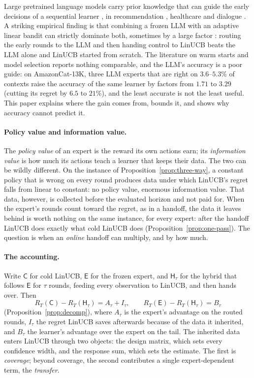 \documentclass{article}
\theoremstyle{definition}
\theoremstyle{remark}
\theoremstyle{remark}
\newcommand{\Cold}{\mathsf{C}}
\newcommand{\Exp}{\mathsf{E}}
\newcommand{\Hyb}{\mathsf{H}}
\begin{document}
Large pretrained language models carry prior knowledge that can guide the
early decisions of a sequential learner
\cite{brown2020language,ouyang2022training,achiam2023gpt,alamdari2024jumpstarting,abbasiyadkori2024believe},
in recommendation \cite{li2010contextual,agarwal2016making}, healthcare
\cite{tewari2017ads,svensson2023sequential} and dialogue \cite{li2016deep}.
A striking empirical finding is that combining a frozen LLM with an adaptive
linear bandit can strictly dominate both, sometimes by a large factor
\cite{chen2024llmdecision,huangcontextual}: routing the early rounds to the
LLM and then handing control to LinUCB beats the LLM alone and LinUCB started
from scratch. The literature on warm starts and model selection
\cite{bastani2021mostly,zhang2019warm,agarwal2017corralling} reports nothing
comparable, and the LLM's accuracy is a poor guide: on AmazonCat-13K, three
LLM experts that are right on $3.6$--$5.3\%$ of contexts raise the accuracy of
the same learner by factors from $1.71$ to $3.29$ (cutting its regret by $6.5$
to $21\%$), and the least accurate is not the least useful. This paper explains where the gain comes from, bounds
it, and shows why accuracy cannot predict it.

\paragraph{Policy value and information value.}
The \emph{policy value} of an expert is the reward its own actions earn; its
\emph{information value} is how much its actions teach a learner that keeps
their data. The two can be wildly different. On the instance of
Proposition~\ref{prop:three-way}, a constant policy that is wrong on every
round produces data under which LinUCB's regret falls from linear to
constant: no policy value, enormous information value. That data, however, is
collected before the evaluated horizon and not paid for. When the expert's
rounds count toward the regret, as in a handoff, the data it leaves behind is
worth nothing on the same instance, for every expert: after the handoff
LinUCB does exactly what cold LinUCB does (Proposition~\ref{prop:one-pass}). The question
is when an \emph{online} handoff can multiply, and by how much.

\paragraph{The accounting.}
Write $\Cold$ for cold LinUCB, $\Exp$ for the frozen expert, and $\Hyb_\tau$
for the hybrid that follows $\Exp$ for $\tau$ rounds, feeding every
observation to LinUCB, and then hands over. Then
\[
R_T(\Cold)-R_T(\Hyb_\tau)=A_\tau+I_\tau,\qquad R_T(\Exp)-R_T(\Hyb_\tau)=B_\tau
\]
(Proposition~\ref{prop:decomp}), where $A_\tau$ is the expert's advantage on
the routed rounds, $I_\tau$ the regret LinUCB saves afterwards because of the
data it inherited, and $B_\tau$ the learner's advantage over the expert on
the tail. The inherited data enters LinUCB through two objects: the design
matrix, which sets every confidence width, and the response sum, which sets
the estimate. The first is \emph{coverage}; beyond coverage, the second
contributes a single expert-dependent term, the \emph{transfer}.
\end{document}
